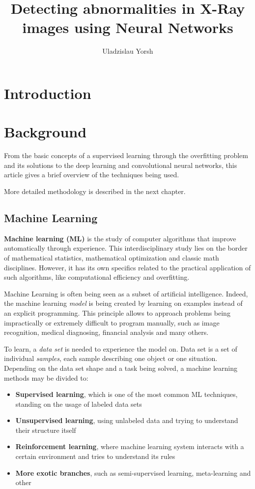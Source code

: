\documentclass[thesis=B,english]{FITthesis}[2019/12/23]
\title{Detecting abnormalities in X-Ray images using Neural Networks}
\author{Uladzislau Yorsh} %
\begin{document}

\chapter{Introduction}


\chapter{Background}

From the basic concepts of a supervised learning through the overfitting problem and its solutions to the deep learning and convolutional neural networks, this article gives a brief overview of the techniques being used.

More detailed methodology is described in the next chapter. 

\section{Machine Learning}

\textbf{Machine learning (ML)} is the study of computer algorithms that improve automatically through experience\cite{machine_learning}. This interdisciplinary study lies on the border of mathematical statistics, mathematical optimization and classic math disciplines. However, it has its own specifics related to the practical application of such algorithms, like computational efficiency and overfitting.

Machine Learning is often being seen as a subset of artificial intelligence. Indeed, the machine learning \textit{model} is being created by learning on examples instead of an explicit programming. This principle allows to approach problems being impractically or extremely difficult to program manually, such as image recognition, medical diagnosing, financial analysis and many others.

To learn, a \textit{data set} is needed to experience the model on. Data set is a set of individual \textit{samples}, each sample describing one object or one situation. Depending on the data set shape and a task being solved, a machine learning methods may be divided to:
\begin{itemize}
	\item \textbf{Supervised learning}, which is one of the most common ML techniques, standing on the usage of labeled data sets
	\item \textbf{Unsupervised learning}, using unlabeled data and trying to understand their structure itself
	\item \textbf{Reinforcement learning}, where machine learning system interacts with a certain environment and tries to understand its rules
	\item \textbf{More exotic branches}, such as semi-supervised learning, meta-learning and other
\end{itemize}
\end{document}
